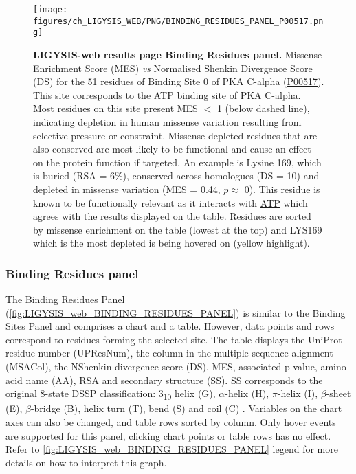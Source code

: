 \begin{figure}[htb!]
    \centering
    \texttt{[image: figures/ch\_LIGYSIS\_WEB/PNG/BINDING\_RESIDUES\_PANEL\_P00517.png]}
    \caption[LIGYSIS-web results page Binding Residues panel]{\textbf{LIGYSIS-web results page Binding Residues panel.} Missense Enrichment Score (MES) \textit{vs} Normalised Shenkin Divergence Score (DS) for the 51 residues of Binding Site 0 of PKA C-alpha (\href{https://www.uniprot.org/uniprotkb/P00517/entry}{P00517}). This site corresponds to the ATP binding site of PKA C-alpha. Most residues on this site present MES $<$ 1 (below dashed line), indicating depletion in human missense variation resulting from selective pressure or constraint. Missense-depleted residues that are also conserved are most likely to be functional and cause an effect on the protein function if targeted. An example is Lysine 169, which is buried (RSA = 6\%), conserved across homologues (DS = 10) and depleted in missense variation (MES = 0.44, $p \approx$ 0). This residue is known to be functionally relevant as it interacts with \href{https://www.ebi.ac.uk/pdbe-srv/pdbechem/chemicalCompound/show/ATP}{ATP} which agrees with the results displayed on the table. Residues are sorted by missense enrichment on the table (lowest at the top) and LYS169 which is the most depleted is being hovered on (yellow highlight).}
    \label{fig:LIGYSIS_web_BINDING_RESIDUES_PANEL}
\end{figure}

\subsubsection{Binding Residues panel}

The Binding Residues Panel (\autoref{fig:LIGYSIS_web_BINDING_RESIDUES_PANEL}) is similar to the Binding Sites Panel and comprises a chart and a table. However, data points and rows correspond to residues forming the selected site. The table displays the UniProt residue number (UPResNum), the column in the multiple sequence alignment (MSACol), the NShenkin divergence score (DS), MES, associated p-value, amino acid name (AA), RSA and secondary structure (SS). SS corresponds to the original 8-state DSSP classification: 3\textsubscript{10} helix (G), $\alpha$-helix (H), $\pi$-helix (I), $\beta$-sheet (E), $\beta$-bridge (B), helix turn (T), bend (S) and coil (C) \cite{KABSCH_1983_DSSP}. Variables on the chart axes can also be changed, and table rows sorted by column. Only hover events are supported for this panel, clicking chart points or table rows has no effect. Refer to \autoref{fig:LIGYSIS_web_BINDING_RESIDUES_PANEL} legend for more details on how to interpret this graph.


